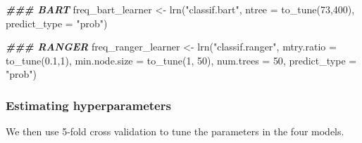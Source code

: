 \documentclass[
]{article}
\newenvironment{Shaded}{\begin{snugshade}}{\end{snugshade}}
\newcommand{\AttributeTok}[1]{\textcolor[rgb]{0.77,0.63,0.00}{#1}}
\newcommand{\DecValTok}[1]{\textcolor[rgb]{0.00,0.00,0.81}{#1}}
\newcommand{\DocumentationTok}[1]{\textcolor[rgb]{0.56,0.35,0.01}{\textbf{\textit{#1}}}}
\newcommand{\FloatTok}[1]{\textcolor[rgb]{0.00,0.00,0.81}{#1}}
\newcommand{\FunctionTok}[1]{\textcolor[rgb]{0.00,0.00,0.00}{#1}}
\newcommand{\NormalTok}[1]{#1}
\newcommand{\OtherTok}[1]{\textcolor[rgb]{0.56,0.35,0.01}{#1}}
\newcommand{\StringTok}[1]{\textcolor[rgb]{0.31,0.60,0.02}{#1}}
\begin{document}
\begin{Shaded}
\begin{Highlighting}[]
\DocumentationTok{\#\#\# BART}
\NormalTok{freq\_bart\_learner }\OtherTok{\textless{}{-}} \FunctionTok{lrn}\NormalTok{(}\StringTok{"classif.bart"}\NormalTok{,}
                        \AttributeTok{ntree =} \FunctionTok{to\_tune}\NormalTok{(}\DecValTok{73}\NormalTok{,}\DecValTok{400}\NormalTok{),}
                        \AttributeTok{predict\_type =} \StringTok{"prob"}\NormalTok{)}

\DocumentationTok{\#\#\# RANGER}
\NormalTok{freq\_ranger\_learner }\OtherTok{\textless{}{-}} \FunctionTok{lrn}\NormalTok{(}\StringTok{"classif.ranger"}\NormalTok{, }
                      \AttributeTok{mtry.ratio =} \FunctionTok{to\_tune}\NormalTok{(}\FloatTok{0.1}\NormalTok{,}\DecValTok{1}\NormalTok{), }
                      \AttributeTok{min.node.size =} \FunctionTok{to\_tune}\NormalTok{(}\DecValTok{1}\NormalTok{, }\DecValTok{50}\NormalTok{), }
                      \AttributeTok{num.trees =} \DecValTok{50}\NormalTok{,}
                      \AttributeTok{predict\_type =} \StringTok{"prob"}\NormalTok{)}
\end{Highlighting}
\end{Shaded}

\hypertarget{estimating-hyperparameters-1}{%
\subsubsection{Estimating
hyperparameters}\label{estimating-hyperparameters-1}}

We then use 5-fold cross validation to tune the parameters in the four
models.
\end{document}
